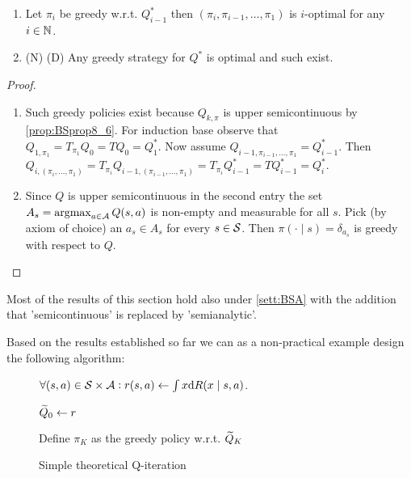 \begin{prop}
  \leavevmode
  \begin{enumerate}
    \item Let $\pi_i$ be greedy w.r.t. $Q_{i-1}^*$ then
      $(\pi_i, \pi_{i-1}, \dots, \pi_1)$ is $i$-optimal for any $i \in \mathbb{N}$.
    \item (N) (D) Any greedy strategy for $Q^*$ is optimal and such exist.
  \end{enumerate}
\end{prop}
\begin{proof}
  \begin{enumerate}
    \item Such greedy policies exist because $Q_{k, \pi}$ is upper
      semicontinuous by \cref{prop:BSprop8_6}.
      For induction base observe that
      $ Q_{1, \pi_1} = T_{\pi_1} Q_0 = T Q_0 = Q_1^*$.
      Now assume $Q_{i-1, {\pi_{i-1}, \dots, \pi_1}} = Q^*_{i-1}$.
      Then
      $Q_{i, (\pi_i, \dots, \pi_1)}
      = T_{\pi_i} Q_{i-1, (\pi_{i-1}, \dots, \pi_1)}
      = T_{\pi_i} Q^*_{i-1} = T Q_{i-1}^* = Q_i^*$.
    \item Since $Q$ is upper semicontinuous in the second entry
      the set $A_s = \operatorname*{argmax}_{a \in \mathcal{A}} Q(s, a)$ is non-empty
      and measurable for all $s$.
      Pick (by axiom of choice) an $a_s \in A_s$ for every $s \in \mathcal{S}$.
      Then $\pi(\cdot \mid s) = \delta_{a_s}$ is greedy with respect to $Q$.
  \end{enumerate}
\end{proof}

\begin{rem}
  Most of the results of this section hold
  also under \cref{sett:BSA} with the addition
  that 'semicontinuous' is replaced by 'semianalytic'.
\end{rem}

Based on the results established so far we can as a non-practical
example design the following algorithm:

\begin{figure}[H]
\begin{algorithm}[H] %
\caption{Simple theoretical Q-iteration}
$\forall (s, a) \in \mathcal{S} \times \mathcal{A} :
r(s, a) \leftarrow \int x \mathrm{d} R(x \mid s, a)$.

$\widetilde{Q}_0 \leftarrow r$

Define $\pi_K$ as the greedy policy w.r.t. $\widetilde{Q}_K$ \\
\label{alg:theoSimpleQ}
\end{algorithm}
\end{figure}

